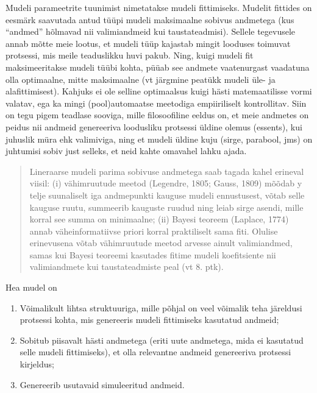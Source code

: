 \documentclass[]{book}
\begin{document}
Mudeli parameetrite tuunimist nimetatakse mudeli fittimiseks. Mudelit
fittides on eesmärk saavutada antud tüüpi mudeli maksimaalne sobivus
andmetega (kus ``andmed'' hõlmavad nii valimiandmeid kui
taustateadmisi). Sellele tegevusele annab mõtte meie lootus, et mudeli
tüüp kajastab mingit looduses toimuvat protsessi, mis meile teaduslikku
huvi pakub. Ning, kuigi mudeli fit maksimeeritakse mudeli tüübi kohta,
püüab see andmete vaatenurgast vaadatuna olla optimaalne, mitte
maksimaalne (vt järgmine peatükk mudeli üle- ja alafittimisest). Kahjuks
ei ole selline optimaalsus kuigi hästi matemaatilisse vormi valatav, ega
ka mingi (pool)automaatse meetodiga empiiriliselt kontrollitav. Siin on
tegu pigem teadlase sooviga, mille filosoofiline eeldus on, et meie
andmetes on peidus nii andmeid genereeriva loodusliku protsessi üldine
olemus (essents), kui juhuslik müra ehk valimiviga, ning et mudeli
üldine kuju (sirge, parabool, jms) on juhtumisi sobiv just selleks, et
neid kahte omavahel lahku ajada.

\begin{quote}
Lineraarse mudeli parima sobivuse andmetega saab tagada kahel erineval
viisil: (i) vähimruutude meetod (Legendre, 1805; Gauss, 1809) mõõdab y
telje suunaliselt iga andmepunkti kauguse mudeli ennustusest, võtab
selle kauguse ruutu, summeerib kauguste ruudud ning leiab sirge asendi,
mille korral see summa on minimaalne; (ii) Bayesi teoreem (Laplace,
1774) annab väheinformatiivse priori korral praktiliselt sama fiti.
Olulise erinevusena võtab vähimruutude meetod arvesse ainult
valimiandmed, samas kui Bayesi teoreemi kasutades fitime mudeli
koefitsiente nii valimiandmete kui taustateadmiste peal (vt 8. ptk).
\end{quote}

Hea mudel on

\begin{enumerate}
\def\labelenumi{\arabic{enumi}.}
\item
  Võimalikult lihtsa struktuuriga, mille põhjal on veel võimalik teha
  järeldusi protsessi kohta, mis genereeris mudeli fittimiseks kasutatud
  andmeid;
\item
  Sobitub piisavalt hästi andmetega (eriti uute andmetega, mida ei
  kasutatud selle mudeli fittimiseks), et olla relevantne andmeid
  genereeriva protsessi kirjeldus;
\item
  Genereerib usutavaid simuleeritud andmeid.
\end{enumerate}
\end{document}
